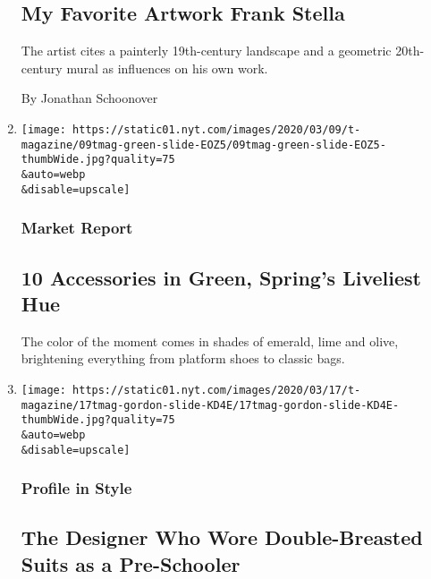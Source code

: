 \begin{enumerate}
  \hypertarget{my-favorite-artwork--frank-stella}{%
  \subsection{My Favorite Artwork \textbar{} Frank
  Stella}\label{my-favorite-artwork--frank-stella}}

  The artist cites a painterly 19th-century landscape and a geometric
  20th-century mural as influences on his own work.

  By Jonathan Schoonover
\item
  \href{/2020/03/17/t-magazine/green-accessories.html}{}

  \texttt{[image: https://static01.nyt.com/images/2020/03/09/t-magazine/09tmag-green-slide-EOZ5/09tmag-green-slide-EOZ5-thumbWide.jpg?quality=75\\\&auto=webp\\\&disable=upscale]}

  \hypertarget{market-report}{%
  \subsubsection{Market Report}\label{market-report}}

  \hypertarget{10-accessories-in-green-springs-liveliest-hue}{%
  \subsection{10 Accessories in Green, Spring's Liveliest
  Hue}\label{10-accessories-in-green-springs-liveliest-hue}}

  The color of the moment comes in shades of emerald, lime and olive,
  brightening everything from platform shoes to classic bags.
\item
  \href{/2020/03/17/t-magazine/wes-gordon-carolina-herrera-inspiration.html}{}

  \texttt{[image: https://static01.nyt.com/images/2020/03/17/t-magazine/17tmag-gordon-slide-KD4E/17tmag-gordon-slide-KD4E-thumbWide.jpg?quality=75\\\&auto=webp\\\&disable=upscale]}

  \hypertarget{profile-in-style}{%
  \subsubsection{Profile in Style}\label{profile-in-style}}

  \hypertarget{the-designer-who-wore-double-breasted-suits-as-a-pre-schooler}{%
  \subsection{The Designer Who Wore Double-Breasted Suits as a
  Pre-Schooler}\label{the-designer-who-wore-double-breasted-suits-as-a-pre-schooler}}


\end{enumerate}
